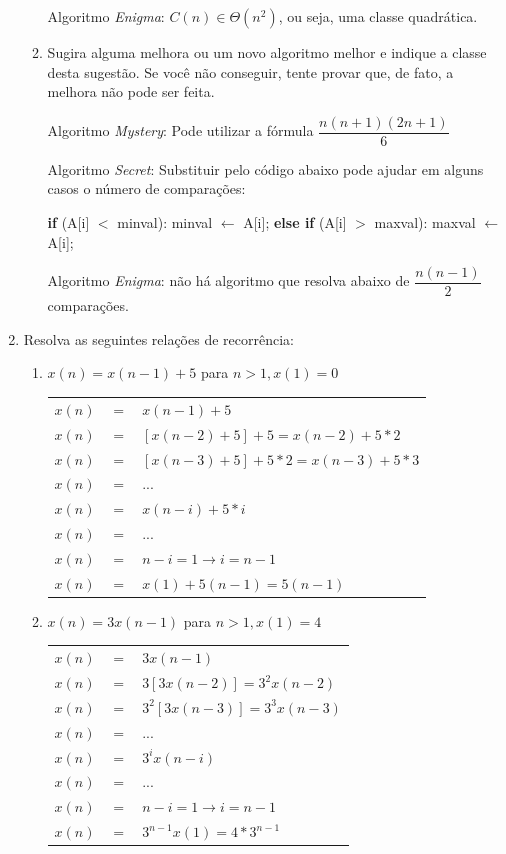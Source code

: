 \documentclass[12pt,a4paper]{article}
\begin{document}
\begin{enumerate}
\begin{enumerate}
		Algoritmo \textit{Enigma}: $C(n) \in \Theta(n^2)$, ou seja, uma classe quadrática.
		
		\item Sugira alguma melhora ou um novo algoritmo melhor e indique a classe desta sugestão. Se você não conseguir, tente provar que, de fato, a melhora não pode ser feita.
		
		Algoritmo \textit{Mystery}: Pode utilizar a fórmula $\dfrac{n(n+1)(2n+1)}{6}$
		
		Algoritmo \textit{Secret}: Substituir pelo código abaixo pode ajudar em alguns casos o número de comparações:
		
		\textbf{if} (A[i] $<$ minval):
		minval $\leftarrow$ A[i];
		\textbf{else if} (A[i] $>$ maxval):
		maxval $\leftarrow$ A[i];		
		
		Algoritmo \textit{Enigma}: não há algoritmo que resolva abaixo de $\dfrac{n(n-1)}{2}$ comparações.
	\end{enumerate}

	\item Resolva as seguintes relações de recorrência:
	
	\begin{enumerate}
		\item $x(n) = x(n-1)+5$ para $n>1, x(1)=0$
		
		\begin{table}[H]
			\centering
			\begin{tabular}{ccl}
				$x(n)$ & $=$ & $x(n-1)+5$\\
				$x(n)$ & $=$ & $[x(n-2)+5]+5 = x(n-2)+5*2$\\
				$x(n)$ & $=$ & $[x(n-3)+5]+5*2 = x(n-3)+5*3$\\
				$x(n)$ & $=$ & ...\\
				$x(n)$ & $=$ & $x(n-i)+5*i$\\
				$x(n)$ & $=$ & ...\\
				$x(n)$ & $=$ & $n-i=1 \rightarrow i=n-1$\\
				$x(n)$ & $=$ & $x(1)+5(n-1) = 5(n-1)$\\
			\end{tabular}
		\end{table}
		
		\item $x(n) = 3x(n-1)$ para $n>1, x(1)=4$
		
		\begin{table}[H]
			\centering
			\begin{tabular}{ccl}
				$x(n)$ & $=$ & $3x(n-1)$\\
				$x(n)$ & $=$ & $3[3x(n-2)] = 3^2x(n-2)$\\
				$x(n)$ & $=$ & $3^2[3x(n-3)] = 3^3x(n-3)$\\
				$x(n)$ & $=$ & ...\\
				$x(n)$ & $=$ & $3^ix(n-i)$\\
				$x(n)$ & $=$ & ...\\
				$x(n)$ & $=$ & $n-i=1 \rightarrow i=n-1$\\
				$x(n)$ & $=$ & $3^{n-1}x(1) = 4*3^{n-1}$\\
			\end{tabular}
		\end{table}
	

\end{enumerate}
\end{enumerate}
\end{document}
